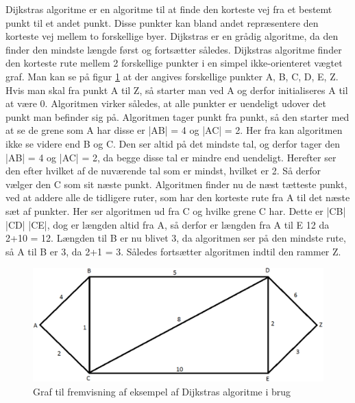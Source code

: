 Dijkstras algoritme er en algoritme til at finde den korteste vej fra et bestemt punkt til et andet punkt. Disse punkter kan bland andet repræsentere den korteste vej mellem to forskellige byer. Dijkstras er en grådig algoritme, da den finder den mindste længde først og fortsætter således.\cite{DMATBOGEN}
Dijkstras algoritme finder den korteste rute mellem 2 forskellige punkter i en simpel ikke-orienteret vægtet graf. Man kan se på figur \ref{fig:dijkstrasgraf} at der angives forskellige punkter {A, B, C, D, E, Z}. Hvis man skal fra punkt A til Z, så starter man ved A og derfor initialiseres A til at være 0. Algoritmen virker således, at alle punkter er uendeligt udover det punkt man befinder sig på. Algoritmen tager punkt fra punkt, så den starter med at se de grene som A har disse er |AB| = 4 og |AC| = 2. Her fra kan algoritmen ikke se videre end B og C. Den ser altid på det mindste tal, og derfor tager den |AB| = 4 og |AC| = 2, da begge disse tal er mindre end uendeligt. Herefter ser den efter hvilket af de nuværende tal som er mindst, hvilket er 2. Så derfor vælger den C som sit næste punkt. Algoritmen finder nu de næst tætteste punkt, ved at addere alle de tidligere ruter, som har den korteste rute fra A til det næste sæt af punkter. Her ser algoritmen ud fra C og hvilke grene C har. Dette er |CB| |CD| |CE|, dog er længden altid fra A, så derfor er længden fra A til E 12 da 2+10 = 12. Længden til B er nu blivet 3, da algoritmen ser på den mindste rute, så A til B er 3, da 2+1 = 3. Således fortsætter algoritmen indtil den rammer Z.\cite{DMATBOGEN}

\begin{figure}[ht!]
\begin{adjustbox}{width=1.2\textwidth,center=\textwidth}
\centering
\includegraphics[width=1.2\textwidth]{Pictures/Teoriafsnit/Figurfiler/dijkstrasgraf.png}
\end{adjustbox}
\label{fig:dijkstrasgraf}
\caption{Graf til fremvisning af eksempel af Dijkstras algoritme i brug}
\end{figure}


